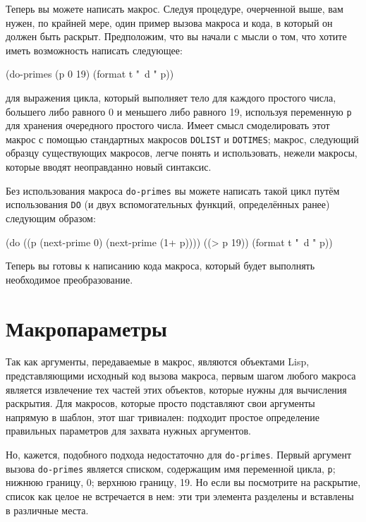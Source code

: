 Теперь вы можете написать макрос. Следуя процедуре, очерченной выше, вам нужен, по крайней
мере, один пример вызова макроса и кода, в который он должен быть раскрыт. Предположим, что
вы начали с мысли о том, что хотите иметь возможность написать следующее:

\begin{myverb}
(do-primes (p 0 19)
  (format t "~d " p))
\end{myverb}

для выражения цикла, который выполняет тело для каждого простого числа, большего либо
равного 0 и меньшего либо равного 19, используя переменную \lstinline{p} для хранения
очередного простого числа. Имеет смысл смоделировать этот макрос с помощью стандартных
макросов \lstinline{DOLIST} и \lstinline{DOTIMES}; макрос, следующий образцу существующих
макросов, легче понять и использовать, нежели макросы, которые вводят неоправданно новый
синтаксис.

Без использования макроса \lstinline{do-primes} вы можете написать такой цикл путём
использования \lstinline{DO} (и двух вспомогательных функций, определённых ранее) следующим
образом:

\begin{myverb}
(do ((p (next-prime 0) (next-prime (1+ p))))
    ((> p 19))
  (format t "~d " p))
\end{myverb}

Теперь вы готовы к написанию кода макроса, который будет выполнять необходимое
преобразование.

\section{Макропараметры}

Так как аргументы, передаваемые в макрос, являются объектами Lisp, представляющими
исходный код вызова макроса, первым шагом любого макроса является извлечение тех частей
этих объектов, которые нужны для вычисления раскрытия. Для макросов, которые просто
подставляют свои аргументы напрямую в шаблон, этот шаг тривиален: подходит простое
определение правильных параметров для захвата нужных аргументов.

Но, кажется, подобного подхода недостаточно для \lstinline{do-primes}. Первый аргумент вызова
\lstinline{do-primes} является списком, содержащим имя переменной цикла, \lstinline{p}; нижнюю
границу, 0; верхнюю границу, 19. Но если вы посмотрите на раскрытие, список как целое
не встречается в нем: эти три элемента разделены и вставлены в различные места.

